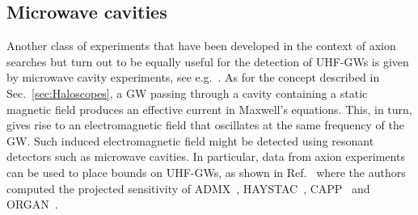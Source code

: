\documentclass[11pt,a4paper]{article}
\begin{document}
\subsection{Microwave cavities}
\label{sec:MicrowaveCavities}

Another class of experiments that have been developed in the context of axion searches but turn out to be equally useful for the detection of UHF-GWs is given by microwave cavity experiments, see e.g.~\cite{Berlin:2021txa, Berlin:2022hfx}. As for the concept described in Sec.~\ref{sec:Haloscopes}, a GW passing through a cavity containing a static magnetic field produces an effective current in Maxwell's equations. This, in turn, gives rise to an electromagnetic field that oscillates at the same frequency of the GW. Such induced electromagnetic field might be detected using resonant detectors such as microwave cavities. In particular, data from axion experiments can be used to place bounds on UHF-GWs, as shown in Ref.~\cite{Berlin:2021txa} where the authors computed the projected sensitivity of ADMX~\cite{ADMX:2021nhd, ADMX:2019uok, ADMX:2018ogs}, HAYSTAC~\cite{HAYSTAC:2018rwy}, CAPP~\cite{Lee:2020cfj} and ORGAN~\cite{McAllister:2017lkb}.
\end{document}
